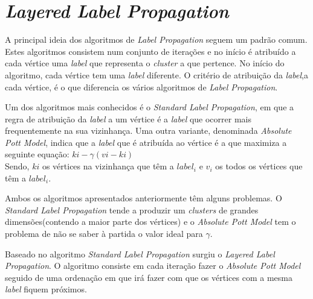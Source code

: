 \documentclass[a4paper,10pt]{report}
\begin{document}
\section*{\textit{Layered Label Propagation}}

  A principal ideia dos algoritmos de \textit{Label Propagation} seguem um padrão comum. Estes algoritmos consistem num conjunto de iterações e no início é atribuído a cada vértice uma \textit{label} que representa o \textit{cluster} a que pertence. No início do algoritmo, cada vértice tem uma \textit{label} diferente. O critério de atribuição da \textit{label},a cada vértice, é o que diferencia os vários algoritmos de \textit{Label Propagation}. 
  
  Um dos algoritmos mais conhecidos é o \textit{Standard Label Propagation}, em que a regra de atribuição da \textit{label} a um vértice é a \textit{label} que ocorrer mais frequentemente na sua vizinhança. Uma outra variante, denominada \textit{Absolute Pott Model}, indica que a \textit{label} que é atribuída ao vértice é a que maximiza a seguinte equação: $ki-\gamma(vi-ki)$\\
  Sendo, $ki$ os vértices na vizinhança que têm a $label_i$ e $v_i$ os todos os vértices que têm a $label_i$.
  
  Ambos os algoritmos apresentados anteriormente têm alguns problemas. O \textit{Standard Label Propagation} tende a produzir um \textit{clusters} de grandes dimensões(contendo a maior parte dos vértices) e o \textit{Absolute Pott Model} tem o problema de não se saber à partida o valor ideal para $\gamma$.
  
  Baseado no algoritmo \textit{Standard Label Propagation} surgiu o \textit{Layered Label Propagation}. O algoritmo consiste em cada iteração fazer o \textit{Absolute Pott Model} seguido de uma ordenação em que irá fazer com que os vértices com a mesma \textit{label} fiquem próximos.
  
\end{document}
